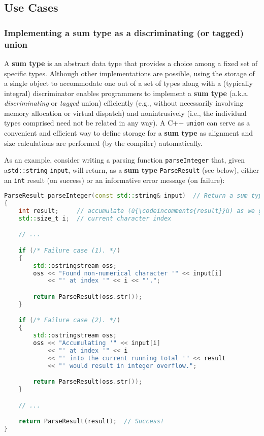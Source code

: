 \subsection[Use Cases]{Use Cases}\label{unrestrictedunion-use-cases}

\subsubsection[Implementing a \textbf{sum type}\glossary{sum type} as a discriminating (or tagged) \tt{union}]{Implementing a \textbf{sum type} as a discriminating (or tagged) {\ParaCode union}}\label{implementing-a-sum-type-as-a-discriminating-(or-tagged)-union}

A \textbf{sum type} is an abstract data type that provides a choice
among a fixed set of specific types. Although other implementations are
possible, using the storage of a single object to accommodate one out of
a set of types along with a (typically integral) discriminator enables
programmers to implement a \textbf{sum type} (a.k.a.
\emph{discriminating} or \emph{tagged} union) efficiently (e.g., without
necessarily involving memory allocation or virtual dispatch) and
nonintrusively (i.e., the individual types comprised need not be related
in any way). A C++ \texttt{union} can serve as a convenient and
efficient way to define storage for a \textbf{sum type} as alignment and
size calculations are performed (by the compiler) automatically.

As an example, consider writing a parsing function \texttt{parseInteger}
that, given a\linebreak[4] \texttt{std::string} \texttt{input}, will return, as a
\textbf{sum type} \texttt{ParseResult} (see below), either an
\texttt{int} result (on success) or an informative error message
(on failure):

\begin{lstlisting}[language=C++]
ParseResult parseInteger(const std::string& input)  // Return a sum type.
{
    int result;     // accumulate (ù{\codeincomments{result}}ù) as we go
    std::size_t i;  // current character index

    // ...

    if (/* Failure case (1). */)
    {
        std::ostringstream oss;
        oss << "Found non-numerical character '" << input[i]
            << "' at index '" << i << "'.";

        return ParseResult(oss.str());
    }

    if (/* Failure case (2). */)
    {
        std::ostringstream oss;
        oss << "Accumulating '" << input[i]
            << "' at index '" << i
            << "' into the current running total '" << result
            << "' would result in integer overflow.";

        return ParseResult(oss.str());
    }

    // ...

    return ParseResult(result);  // Success!
}
\end{lstlisting}
    
